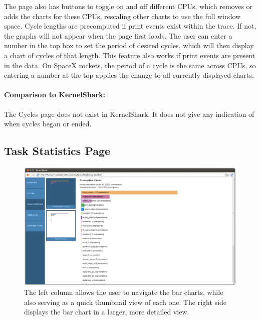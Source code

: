 \documentclass{hmcclinic}
\begin{document}
The page also has buttons to toggle on and off different CPUs, which removes
    or adds the charts for these CPUs, rescaling other charts to use the full window
    space. Cycle lengths are precomputed if print events exist within the trace. If
    not, the graphs will not appear when the page first loads. The user can enter a
    number in the top box to set the period of desired cycles, which will then
    display a chart of cycles of that length. This feature also works  if
    print events are present in the data. On SpaceX rockets, the period of a cycle 
    is the same across CPUs, so entering a number at the top applies the change
    to all currently displayed charts.
        
\paragraph{Comparison to KernelShark:}
    The Cycles page does not exist in KernelShark. It does not give any indication of when cycles began or ended.
    
  
  \subsection{Task Statistics Page} %

  \begin{figure}[H]
  \includegraphics[width=5in]{task-statistics-page.png}
  \caption{The left column allows the user to navigate the bar charts, while
    also serving as a quick thumbnail view of each one. The right side displays
  the bar chart in a larger, more detailed view.}
  \end{figure}
\end{document}
